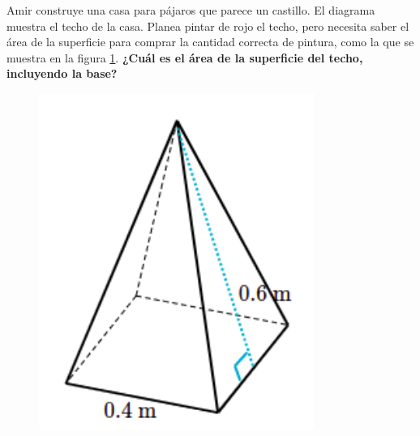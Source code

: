 Amir construye una casa para pájaros que parece un castillo. El diagrama muestra el techo de la casa.
Planea pintar de rojo el techo, pero necesita saber el área de la superficie para comprar la cantidad correcta de pintura,
como la que se muestra en la figura \ref{fig:prob_verb_superficie_06}.
\textbf{¿Cuál es el área de la superficie del techo, incluyendo la base?}

\begin{minipage}{0.3\linewidth}
    \begin{figure}[H]
        \begin{center}
            \includegraphics[width=0.8\textwidth]{../images/prob_verb_superficie_06}
        \end{center}
        \caption{}
        \label{fig:prob_verb_superficie_06}
    \end{figure}
\end{minipage}
\begin{minipage}{0.7\linewidth}
    \begin{solutionbox}{6cm}
    \end{solutionbox}
\end{minipage}